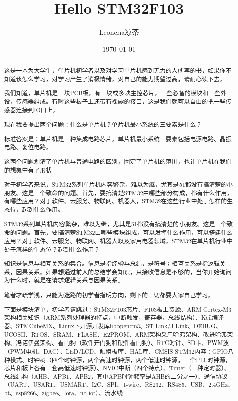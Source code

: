 \documentclass[UTF8]{ctexart}
\begin{document}
\title{Hello STM32F103}
\author{Leoncha凉茶}
\date{\today}
\maketitle
{}

\newpage
\begin{abstract}
这是一本为大学生，单片机初学者以及对学习单片机感到无力的人所写的书，如果你不知道该怎么学习，对学习产生了消极情绪，对自己的能力期望过高，请耐心读下去。
  
我们知道，单片机是一块PCB板，有一块或多块主控芯片，一些必备的模块和一些外设，传感器组成。有时这些板子上还带有裸露的接口，这是我们就可以自由的把一些传感器连接到IO口上。

现在我要提出两个问题：什么是单片机？单片机最小系统的三要素是什么？

标准答案是：单片机是一种集成电路芯片。单片机最小系统三要素包括电源电路、晶振电路、复位电路。

这两个问题划清了单片机与普通电路的区别，圈定了单片机的范围，也让单片机在我们的想象中有了形状

对于初学者来说，STM32系列单片机内容繁杂，难以为继，尤其是51都没有搞清楚的小朋友。这是一个致命的问题。首先，要搞清楚STM32由哪些部分构成，都有什么作用，有哪些应用？对于软件、云服务、物联网、机器人，STM32在这些行业中处于怎样的生态位，起到什么作用。

STM32系列单片机内容繁杂，难以为继，尤其是51都没有搞清楚的小朋友。这是一个致命的问题。首先，要搞清楚STM32由哪些模块组成，可以发挥什么作用，可以搭建什么应用？对于软件、云服务、物联网、机器人以及家用电器领域，STM32在单片机行业中处于怎样的生态位？起到什么作用？

知识是信息与相互关系的集合。信息是指经验与总结，是符号；相互关系是指逻辑关系，因果关系。如果想通过前人的总结学会知识，只接收信息是不够的，当你开始询问为什么时，就是在请求逻辑关系与因果关系。

笔者才疏学浅，只能为迷路的初学者指明方向，剩下的一切都要大家自己学习。

下面是模块清单，初学者请跳过：STM32F103芯片、F103板上资源、ARM Cortex-M3架构相关知识（ARM系列处理器的特点，中断触发，寄存器，总线结构）、Keil编译器、STMCubeMX、Linux下开源开发库libopencm3、ST-Link/J-Link、DEBUG、UCOSII、RTOS、SRAM、FLASH、E2PROM、ARM架构采用哈弗架构、改进哈弗架构、冯诺伊曼架构、看门狗（软件开门狗和硬件看门狗）、RTC时钟、SD卡、PWM波（PWM电机、DAC）、LED/LCD、触摸板库、HAL库、CMSIS
STM32内容：GPIO八种模式、时钟树（四个时钟源，两个高速时钟源，两个低速时钟源，一个PLL时钟源，芯片和板上各有一套高低速时钟源）、NVIC中断（四个特点）、Timer（三种定时器）、总线结构（AHB、APB1、APB2，其中APB时钟频率是AHB的二分之一）、通信协议（UART、USART、USMART、I2C、SPI、1-wire、RS232、RS485、USB、2.4GHz、bt、esp8266、zigbee、lora、nb-iot）、流水线
\end{abstract}
\end{document}
